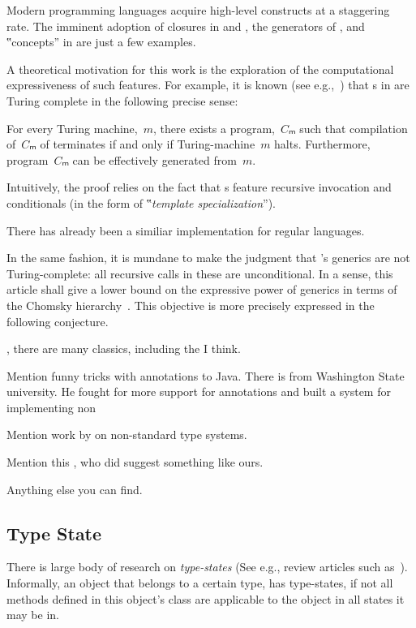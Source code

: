 Modern programming languages acquire high-level constructs
  at a staggering rate.
The imminent adoption of closures in \Java and \CC,
  the generators of \CSharp, and ‟concepts” in
  \CC are just a few examples.

A theoretical motivation for this work
  is the exploration of the computational
  expressiveness of such features.
For example, it is known (see e.g.,~\cite{Gutterman:2003}) that
  s in \CC are Turing complete in the following precise sense:

\begin{Theorem}
  \label{Theorem:Gutterman}
  For every Turing machine,~$m$, there exists a \CC program,~$Cₘ$ such that
    compilation of~$Cₘ$ of terminates if and only if
      Turing-machine~$m$ halts.
  Furthermore, program~$Cₘ$ can be effectively generated from~$m$.
\end{Theorem}

Intuitively, the proof relies on the fact that s
  feature recursive invocation and conditionals (in the form of
  ‟\emph{template specialization}”).

There has already been a similiar \Java implementation for regular
  languages.
  
In the same fashion, it is mundane to make the judgment that
  \Java's generics are not Turing-complete: all recursive calls
  in these are unconditional.
In a sense, this article shall give a lower bound on the
  expressive power of \Java generics in terms of the Chomsky hierarchy~\cite{Chomsky:1963}.
This objective is more precisely expressed in the following conjecture.

\cite{Mention:all:C++:template:programming}, there are many classics, including the \cite{Abrahams:Gurtovoy:04} I think. 

Mention funny tricks with annotations to Java. There is \cite{Michael:Earnst} from 
  Washington State university. He fought for more support for annotations 
  and built a system for implementing non

Mention work by \cite{Bracha} on non-standard type systems.  

Mention this \cite{German:(?):guy}, who did suggest something like ours.  

Anything else you can find.

\subsection{Type State}
There is large body of research on \emph{type-states} (See e.g., review articles such
  as~\cite{Aldrich:Sunshine:2009,Bierhoff:Aldrich:2005}).
Informally, an object that belongs to a certain type, has
type-states, if not all methods defined in this object's class are applicable
to the object in all states it may be in.

